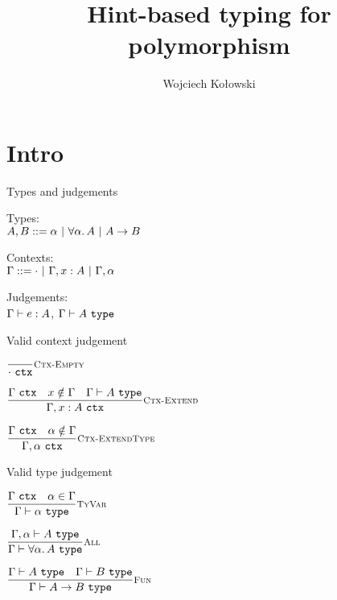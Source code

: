 \documentclass{beamer}
\title{Hint-based typing for polymorphism}
\author{Wojciech Kołowski}
\date{}
\begin{document}
\frame{\titlepage}

\section{Intro}

\begin{frame}{Types and judgements}

Types: \\
$A, B ::= \alpha \pipe \ForallT{\alpha}{A} \pipe \Fun{A}{B}$

\vspace{1em}

Contexts: \\
$\Gamma ::= \emptytypingctx \pipe \extend{\Gamma}{x}{A} \pipe \extendtype{\Gamma}{\alpha}$

\vspace{1em}

Judgements: \\
$\typing{e}{A}$, $\type{A}$

\end{frame}

\begin{frame}{Valid context judgement}

\begin{center}
  $\infrule[Ctx-Empty]{}{\tyctx{\emptytypingctx}}$

  \vspace{2em}

  $\infrule[Ctx-Extend]{\tyctx{\Gamma} \quad \sidecond{x \notin \Gamma} \quad \type{A}}{\tyctx{\extend{\Gamma}{x}{A}}}$

  \vspace{2em}

  $\infrule[Ctx-ExtendType]{\tyctx{\Gamma} \quad \sidecond{\alpha \notin \Gamma}}{\tyctx{\extendtype{\Gamma}{\alpha}}}$
\end{center}

\end{frame}

\begin{frame}{Valid type judgement}

\begin{center}
  $\infrule[TyVar]{\tyctx{\Gamma} \quad \sidecond{\alpha \in \Gamma}}{\type{\alpha}}$

  \vspace{2em}

  $\infrule[All]{\fulltype{\extendtype{\Gamma}{\alpha}}{A}}{\type{\ForallT{\alpha}{A}}}$

  \vspace{2em}

  $\infrule[Fun]{\type{A} \quad \type{B}}{\type{\Fun{A}{B}}}$
\end{center}

\end{frame}
\end{document}
